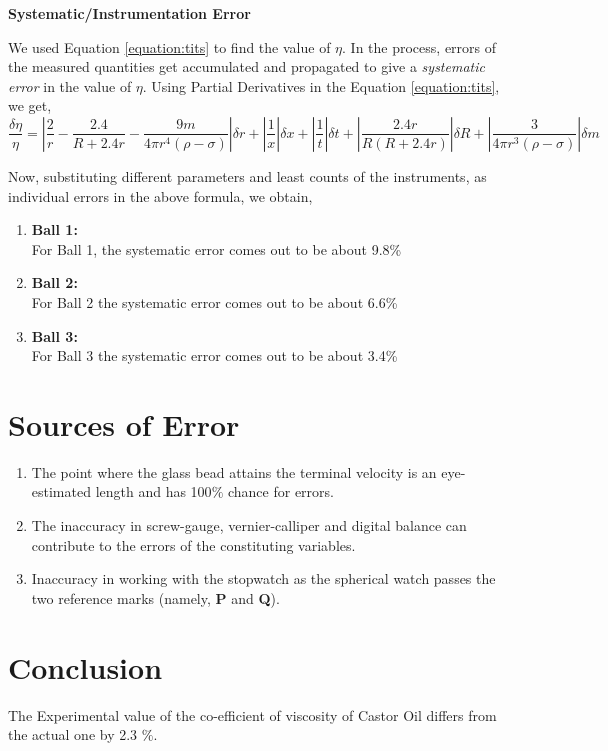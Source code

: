 \documentclass{article}
\begin{document}
	\textbf{Systematic/Instrumentation Error}
	
	We used Equation \ref{equation:tits} to find the value of $\eta$. In the process, errors of the measured quantities get accumulated and propagated to give a \emph{systematic error} in the value of $\eta$. Using Partial Derivatives in the Equation \ref{equation:tits}, we get,
	$$\frac{\delta\eta}{\eta} = \left|\frac{2}{r} - \frac{2.4}{R + 2.4r} - \frac{9m}{4\pi r^{4} (\rho - \sigma)}\right| \delta r + \left|\frac{1}{x}\right| \delta x + \left|\frac{1}{t}\right| \delta t + \left|\frac{2.4r}{R(R + 2.4r)}\right| \delta R + \left|\frac{3}{4 \pi r^{3}(\rho - \sigma)}\right| \delta m$$
	
	Now, substituting different parameters and least counts of the instruments, as individual errors in the above formula, we obtain,
	
	\begin{enumerate}
		\item \textbf{Ball 1:} \\
		For Ball 1, the systematic error comes out to be about 9.8\%
		\item \textbf{Ball 2:}\\
		For Ball 2 the systematic error comes out to be about 6.6\%
		\item \textbf{Ball 3:}\\
		For Ball 3 the systematic error comes out to be about 3.4\%
	\end{enumerate}
	
	\section{Sources of Error}
	
	\begin{enumerate}
		\item The point where the glass bead attains the terminal velocity is an eye-estimated length and 
		has 100$\%$ chance for errors.
		
		\item The inaccuracy in screw-gauge, vernier-calliper and digital balance can contribute to the errors of 
		the constituting variables.
		
		\item Inaccuracy in working with the stopwatch as the spherical watch passes the two reference marks (namely, \textbf{P} and \textbf{Q}).
	\end{enumerate}
		\section{Conclusion}
		
		The Experimental value of the co-efficient of viscosity of Castor Oil differs from the actual 
		one by 2.3 $\%$.
\end{document}
